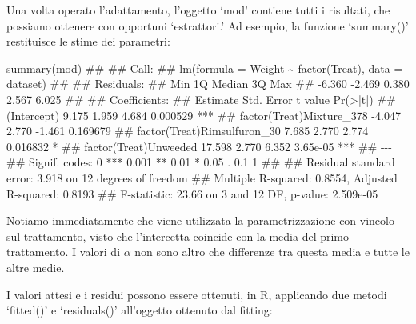 \documentclass[a4paper,12pt,oneside]{book}
\newenvironment{Shaded}{\begin{snugshade}}{\end{snugshade}}
\newcommand{\DocumentationTok}[1]{#1}
\newcommand{\FunctionTok}[1]{#1}
\newcommand{\NormalTok}[1]{#1}
\begin{document}
Una volta operato l'adattamento, l'oggetto `mod' contiene tutti i risultati, che possiamo ottenere con opportuni `estrattori.' Ad esempio, la funzione `summary()' restituisce le stime dei parametri:

\vspace{12pt}

\tiny

\begin{Shaded}
\begin{Highlighting}[]
\FunctionTok{summary}\NormalTok{(mod)}
\DocumentationTok{\#\# }
\DocumentationTok{\#\# Call:}
\DocumentationTok{\#\# lm(formula = Weight \textasciitilde{} factor(Treat), data = dataset)}
\DocumentationTok{\#\# }
\DocumentationTok{\#\# Residuals:}
\DocumentationTok{\#\#    Min     1Q Median     3Q    Max }
\DocumentationTok{\#\# {-}6.360 {-}2.469  0.380  2.567  6.025 }
\DocumentationTok{\#\# }
\DocumentationTok{\#\# Coefficients:}
\DocumentationTok{\#\#                             Estimate Std. Error t value Pr(\textgreater{}|t|)    }
\DocumentationTok{\#\# (Intercept)                    9.175      1.959   4.684 0.000529 ***}
\DocumentationTok{\#\# factor(Treat)Mixture\_378      {-}4.047      2.770  {-}1.461 0.169679    }
\DocumentationTok{\#\# factor(Treat)Rimsulfuron\_30    7.685      2.770   2.774 0.016832 *  }
\DocumentationTok{\#\# factor(Treat)Unweeded         17.598      2.770   6.352 3.65e{-}05 ***}
\DocumentationTok{\#\# {-}{-}{-}}
\DocumentationTok{\#\# Signif. codes:  0 \textquotesingle{}***\textquotesingle{} 0.001 \textquotesingle{}**\textquotesingle{} 0.01 \textquotesingle{}*\textquotesingle{} 0.05 \textquotesingle{}.\textquotesingle{} 0.1 \textquotesingle{} \textquotesingle{} 1}
\DocumentationTok{\#\# }
\DocumentationTok{\#\# Residual standard error: 3.918 on 12 degrees of freedom}
\DocumentationTok{\#\# Multiple R{-}squared:  0.8554, Adjusted R{-}squared:  0.8193 }
\DocumentationTok{\#\# F{-}statistic: 23.66 on 3 and 12 DF,  p{-}value: 2.509e{-}05}
\end{Highlighting}
\end{Shaded}

\normalsize

Notiamo immediatamente che viene utilizzata la parametrizzazione con vincolo sul trattamento, visto che l'intercetta coincide con la media del primo trattamento. I valori di \(\alpha\) non sono altro che differenze tra questa media e tutte le altre medie.

I valori attesi e i residui possono essere ottenuti, in R, applicando due metodi `fitted()' e `residuals()' all'oggetto ottenuto dal fitting:
\end{document}
